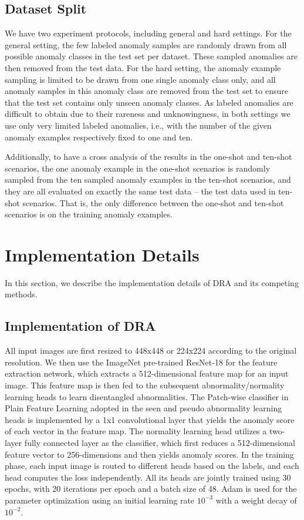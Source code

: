 \documentclass[10pt,twocolumn,letterpaper]{article}
\begin{document}
\subsection{Dataset Split}
We have two experiment protocols, including general and hard settings.
For the general setting, the few labeled anomaly samples are randomly drawn from all possible anomaly classes in the test set per dataset. These sampled anomalies are then removed from the test data. For the hard setting, the anomaly example sampling is limited to be drawn from one single anomaly class only, and all anomaly samples in this anomaly class are removed from the test set to ensure that the test set contains only unseen anomaly classes. As labeled anomalies are difficult to obtain due to their rareness and unknowingness, in both settings we use only very limited labeled anomalies, i.e., with the number of the given anomaly examples respectively fixed to one and ten.

Additionally, to have a cross analysis of the results in the one-shot and ten-shot scenarios, the one anomaly example in the one-shot scenarios is randomly sampled from the ten sampled anomaly examples in the ten-shot scenarios, and they are all evaluated on exactly the same test data -- the test data used in ten-shot scenarios. That is, the only difference between the one-shot and ten-shot scenarios is on the training anomaly examples. 


\section{Implementation Details}
In this section, we describe the implementation details of DRA and its competing methods.
\subsection{Implementation of DRA}\label{app:implementation}
All input images are first resized to 448x448 or 224x224 according to the original resolution. We then use the ImageNet pre-trained ResNet-18 for the feature extraction network, which extracts a 512-dimensional feature map for an input image. This feature map is then fed to the subsequent abnormality/normality learning heads to learn disentangled abnormalities. The Patch-wise classifier in Plain Feature Learning adopted in the seen and pseudo abnormality learning heads is implemented by a 1x1 convolutional layer that yields the anomaly score of each vector in the feature map. The normality learning head utilizes a two-layer fully connected layer as the classifier, which first reduces a 512-dimensional feature vector to 256-dimensions and then yields anomaly scores. In the training phase, each input image is routed to different heads based on the labels, and each head computes the loss independently. All its heads are jointly trained using 30 epochs, with 20 iterations per epoch and a batch size of 48. Adam is used for the parameter optimization using an initial learning rate $10^{-3}$ with a weight decay of $10^{-2}$.
\end{document}
